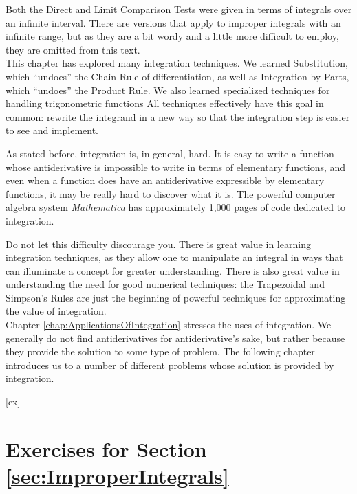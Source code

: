 


%
Both the Direct and Limit Comparison Tests were given in terms of integrals over an infinite interval. There are versions that apply to improper integrals with an infinite range, but as they are a bit wordy and a little more difficult to employ, they are omitted from this text.\\

This chapter has explored many integration techniques. We learned Substitution, which ``undoes'' the Chain Rule of differentiation, as well as Integration by Parts, which ``undoes'' the Product Rule. We also learned specialized techniques for handling trigonometric functions %
All techniques effectively have this goal in common: rewrite the integrand in a new way so that the integration step is easier to see and implement. 

As stated before, integration is, in general, hard. It is easy to write a function whose antiderivative is impossible to write in terms of elementary functions, and even when a function does have an antiderivative expressible by elementary functions, it may be really hard to discover what it is. The powerful computer algebra system \textit{Mathematica}\textsuperscript{\textregistered} has approximately 1,000 pages of code dedicated to integration. 

Do not let this difficulty discourage you. There is great value in learning integration techniques, as they allow one to manipulate an integral in ways that can illuminate a concept for greater understanding. There is also great value in understanding the need for good numerical techniques: the Trapezoidal and Simpson's Rules are just the beginning of powerful techniques for approximating the value of integration.\\

Chapter \ref{chap:ApplicationsOfIntegration} stresses the uses of integration. We generally do not find antiderivatives for antiderivative's sake, but rather because they provide the solution to some type of problem. The following chapter introduces us to a number of different problems whose solution is provided by integration.



[ex]
\section*{Exercises for Section \ref{sec:ImproperIntegrals}}

